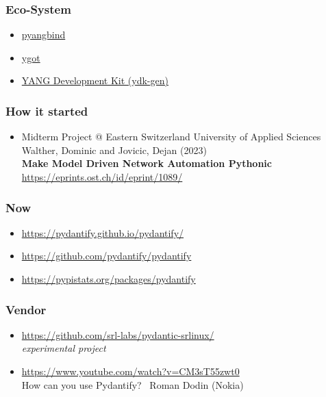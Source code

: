\documentclass[aspectratio=169]{beamer}
\begin{document}
\begin{frame}
  \frametitle{Eco-System}
  \begin{itemize}
    \setlength\itemsep{1em}
    \item \href{https://github.com/robshakir/pyangbind}{pyangbind}
    \item \href{https://github.com/openconfig/ygot}{ygot}
    \item \href{https://github.com/CiscoDevNet/ydk-gen}{YANG Development Kit (ydk-gen)}
  \end{itemize}
\end{frame}


\begin{frame}
  \frametitle{How it started}
  \begin{itemize}
    \setlength\itemsep{1em}
    \item Midterm Project @ Eastern Switzerland University of Applied Sciences\\ Walther, Dominic and Jovicic, Dejan (2023)\\ \textbf{Make Model Driven Network Automation Pythonic}\\\url{https://eprints.ost.ch/id/eprint/1089/}
  \end{itemize}
\end{frame}

\begin{frame}
  \frametitle{Now}
  \begin{itemize}
    \setlength\itemsep{1em}
    \item \url{https://pydantify.github.io/pydantify/}
    \item \url{https://github.com/pydantify/pydantify}
    \item \url{https://pypistats.org/packages/pydantify}
  \end{itemize}
\end{frame}

\begin{frame}
  \frametitle{Vendor}
  \begin{itemize}
    \setlength\itemsep{1em}
    \item \url{https://github.com/srl-labs/pydantic-srlinux/}\\\textit{experimental project}
    \item \url{https://www.youtube.com/watch?v=CM3sT55zwt0}\\How can you use Pydantify? \textemdash \ Roman Dodin (Nokia)
  \end{itemize}
\end{frame}
\end{document}
